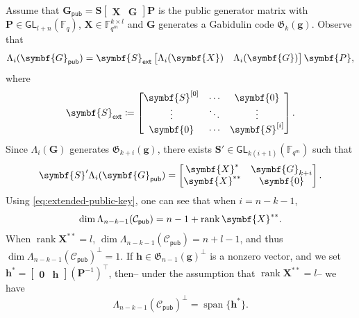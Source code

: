 \documentclass[version=last, paper=A4, parskip=half, oneside,%
toc=bibliography, toc=listof, listof=leveldown]{scrbook}
\theoremstyle{plain}
\theoremstyle{definition}
\theoremstyle{remark}
\renewcommand*{\vec}{\symbf}
\newcommand*{\mat}{\symbf}
\newcommand*{\trans}{\top}%
\DeclareMathOperator{\rank}{rank}
\DeclareMathOperator{\lspan}{span}
\newcommand*{\GL}{\ensuremath{\mathsf{GL}}}
\newcommand*{\pub}{\ensuremath{\mathsf{pub}}}
\newcommand*{\FF}{\ensuremath{\mathbb{F}}}
\newcommand*{\Gab}{\ensuremath{\mathfrak{G}}}
\newcommand*{\ext}{\ensuremath{\mathsf{ext}}}
\begin{document}
Assume that
\(\mat{G}_{\pub} = \mat{S} \begin{bmatrix} \mat{X} & \mat{G}\end{bmatrix} \mat{P}\)
is the public generator matrix with \(\mat{P} \in \GL_{l + n}( \FF_q)\),
\(\mat{X} \in \FF_{q^m}^{k \times l}\) and \(\mat{G}\) generates a Gabidulin
code \(\Gab_k(\vec{g})\).  Observe that
\[
  \Lambda_i(\mat{G}_{\pub}) =
  \mat{S}_{\ext} \begin{bmatrix} \Lambda_i(\mat{X}) & \Lambda_i(\mat{G}) \end{bmatrix} \mat{P}\text,
\]
where
\[
  \mat{S}_{\ext} \coloneqq
  \begin{bmatrix}
    \mat{S}^{[0]} & \cdots & \mat{0} \\
    \vdots & \ddots & \vdots \\
    \mat{0} & \cdots & \mat{S}^{[i]}
  \end{bmatrix}\text.
\]
Since \(\Lambda_i(\mat{G})\) generates \(\Gab_{k + i}(\vec{g})\), there exists
\(\mat{S}' \in \GL_{k (i + 1)}(\FF_{q^m})\) such that
\begin{equation}\label{eq:extended-public-key}
  \mat{S}' \Lambda_i(\mat{G}_{\pub}) =
  \begin{bmatrix}
    \mat{X}^* & \mat{G}_{k + i} \\
    \mat{X}^{**} & \mat{0}
  \end{bmatrix}\text.
\end{equation}
Using \cref{eq:extended-public-key}, one can see that when \(i = n - k - 1\),
\[
  \dim \Lambda_{n - k - 1}(\mathcal{C}_{\pub}) = n - 1 + \rank \mat{X}^{**}\text.
\]
When \(\rank \mat{X}^{**} = l\),
\(\dim \Lambda_{n - k - 1}(\mathcal{C}_{\pub}) = n + l - 1\), and thus
\(\dim {\Lambda_{n - k - 1}(\mathcal{C}_{\pub})}^{\perp} = 1\).  If
\(\vec{h} \in {\Gab_{n - 1}(\vec{g})}^{\perp}\) is a nonzero vector, and we set
\(\vec{h}^* = \begin{bmatrix} \vec{0} & \vec{h} \end{bmatrix} {(\mat{P}^{-1})}^{\trans}\),
then\--- under the assumption that \(\rank \mat{X}^{**} = l\)\--- we have
\begin{equation}\label{eq:spanning-the-dual}
  {\Lambda_{n - k - 1}(\mathcal{C}_{\pub})}^{\perp} = \lspan\{\vec{h}^*\}.
\end{equation}
\end{document}
